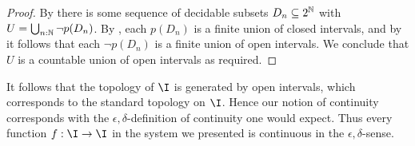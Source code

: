 \begin{proof}
  By 
  there is some sequence of decidable subsets $D_n\subseteq 2^{\mathbb{N}}$ 
  with $U = \bigcup_{n:\mathbb{N}} \neg p(D_n)$. 
  By , each $p(D_n)$ is a finite union of closed intervals, 
  and by  it follows that each $\neg p(D_n)$ is a finite union of open intervals. 
  We conclude that $U$ is a countable union of open intervals as required. 
\end{proof}
%
%

\begin{remark}\label{IntervalTopologyStandard}
  It follows that the topology of $\I$ is generated by open intervals, 
  which corresponds to the standard topology on $\I$. 
  Hence our notion of continuity corresponds with the $\epsilon,\delta$-definition of continuity one would expect. 
  Thus every function $f:\I\to \I$ in the system we presented is continuous in the $\epsilon,\delta$-sense. 
\end{remark}
